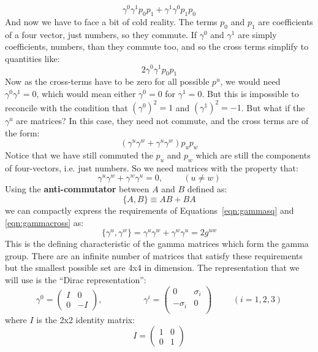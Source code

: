 \documentclass[12pt]{book}
\begin{document}
$$\gamma^0 \gamma^1 p_0 p_1 + \gamma^1 \gamma^0 p_1 p_0$$
And now we have to face a bit of cold reality.  The terms $p_0$ and $p_1$ are coefficients of a four vector, just numbers, so they commute.  If $\gamma^0$ and $\gamma^1$ are simply coefficients, numbers, than they commute too, and so the cross terms simplify to quantities like:
$$2 \gamma^0 \gamma^1 p_0 p_1$$
Now as the cross-terms have to be zero for all possible $p^u$, we would need $\gamma^0 \gamma^1 = 0$, which would mean either $\gamma^0 = 0$ for $\gamma^1=0$.  But this is impossible to reconcile with the condition that $(\gamma^0)^2 = 1$ and $(\gamma^1)^2 = -1$.
But what if the $\gamma^u$ are matrices?  In this case, they need not commute, and the cross terms are of the form:
$$(\gamma^u \gamma^w + \gamma^u \gamma^w) p_u p_w$$
Notice that we have still commuted the $p_u$ and $p_w$ which are still the components of four-vectors, i.e. just numbers.  So we need matrices with the property that:
\begin{equation}
\label{eqn:gammacross}
\gamma^u \gamma^w + \gamma^w \gamma^u = 0, \hspace{1cm} (u \neq w)
\end{equation}
Using the {\bf anti-commutator} between $A$ and $B$ defined as:
$$\{A, B\} \equiv A B + B A$$
we can compactly express the requirements of Equations~\ref{eqn:gammasq} and \ref{eqn:gammacross} as:
\begin{equation}
\label{eqn:gammaanti}
\{\gamma^u, \gamma^w\} = \gamma^u \gamma^w + \gamma^w \gamma^u = 2 g^{uw}
\end{equation}
This is the defining characteristic of the gamma matrices which form the gamma group.  There are an infinite number of matrices that satisfy these requirements 
but the smallest possible set are 4x4 in dimension.  The representation that we will use is the ``Dirac representation'':
\begin{equation}
\label{eqn:gammamats}
\gamma^0 = \begin{pmatrix} I & 0 \\ 0 & -I \end{pmatrix}, \hspace{2cm}
\gamma^i = \begin{pmatrix} 0 & \sigma_i \\ -\sigma_i & 0 \\ \end{pmatrix}
\hspace{1cm} (i=1,2,3)
\end{equation}
where $I$ is the 2x2 identity matrix:
$$I = \begin{pmatrix} 1 & 0 \\ 0 & 1 \end{pmatrix} $$
\end{document}

